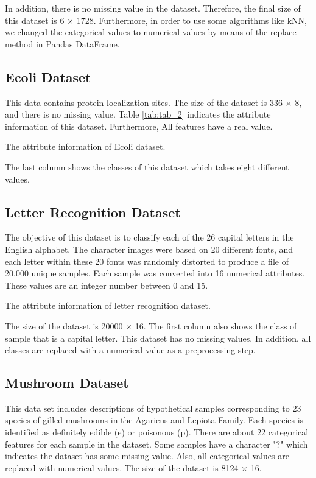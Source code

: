 In addition, there is no missing value in the dataset. Therefore, the final size of this dataset is 6 $\times$ 1728. Furthermore, in order to use some algorithms like kNN, we changed the categorical values to numerical values by means of the replace method in Pandas DataFrame. 




\subsection{Ecoli Dataset}
This data contains protein localization sites. The size of the dataset is 336 $\times$ 8, and there is no missing value. Table \ref{tab:tab_2} indicates the attribute information of this dataset. Furthermore, All features have a real value.

\begin{table}[H]
\centering
\caption{The attribute information of Ecoli dataset.}
\label{tab:tab_2}

\end{table}

The last column shows the classes of this dataset which takes eight different values.




\subsection{Letter Recognition Dataset}

The objective of this dataset is to classify each of the 26 capital letters in the English alphabet. The character images were based on 20 different fonts, and each letter within these 20 fonts was randomly distorted to produce a file of 20,000 unique samples. Each sample was converted into 16 numerical attributes. These values are an integer number between 0 and 15. 

\begin{table}[H]
\centering
\caption{The attribute information of letter recognition dataset.}
\label{tab:tab_3}

\end{table}

The size of the dataset is 20000 $\times$ 16. The first column also shows the class of sample that is a capital letter. This dataset has no missing values. In addition, all classes are replaced with a numerical value as a preprocessing step.

\subsection{Mushroom Dataset}

This data set includes descriptions of hypothetical samples corresponding to 23 species of gilled mushrooms in the Agaricus and Lepiota Family. Each species is identified as definitely edible (e) or poisonous (p). There are about 22 categorical features for each sample in the dataset. Some samples have a character "?" which indicates the dataset has some missing value. Also, all categorical values are replaced with numerical values. The size of the dataset is 8124 $\times$ 16.


